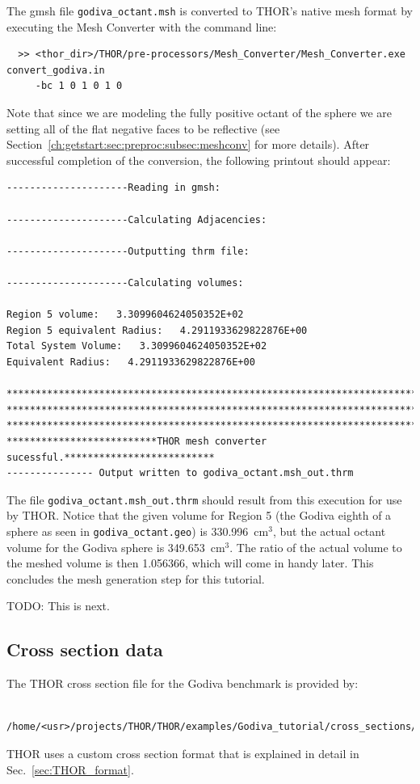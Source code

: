 The gmsh file \verb"godiva_octant.msh" is converted to THOR's native mesh format by executing the Mesh Converter with the command line:
\begin{verbatim}
  >> <thor_dir>/THOR/pre-processors/Mesh_Converter/Mesh_Converter.exe convert_godiva.in
     -bc 1 0 1 0 1 0
\end{verbatim}
Note that since we are modeling the fully positive octant of the sphere we are setting all of the flat negative faces to be reflective (see Section~\ref{ch:getstart:sec:preproc:subsec:meshconv} for more details).
After successful completion of the conversion, the following printout should appear:
\begin{verbatim}
---------------------Reading in gmsh:

---------------------Calculating Adjacencies:

---------------------Outputting thrm file:

---------------------Calculating volumes:

Region 5 volume:   3.3099604624050352E+02
Region 5 equivalent Radius:   4.2911933629822876E+00
Total System Volume:   3.3099604624050352E+02
Equivalent Radius:   4.2911933629822876E+00

**********************************************************************************
**********************************************************************************
**********************************************************************************
**************************THOR mesh converter sucessful.**************************
--------------- Output written to godiva_octant.msh_out.thrm
\end{verbatim}

The file \verb"godiva_octant.msh_out.thrm" should result from this execution for use by THOR.
Notice that the given volume for Region 5 (the Godiva eighth of a sphere as seen in \verb"godiva_octant.geo") is 330.996~cm$^3$, but the actual octant volume for the Godiva sphere is 349.653~cm$^3$.
The ratio of the actual volume to the meshed volume is then 1.056366, which will come in handy later.
This concludes the mesh generation step for this tutorial.

TODO: This is next.

\subsection{Cross section data}
The THOR cross section file for the Godiva benchmark is provided by:
\begin{verbatim}
    /home/<usr>/projects/THOR/THOR/examples/Godiva_tutorial/cross_sections/godiva.xs
\end{verbatim}
THOR uses a custom cross section format that is explained in detail in Sec.~\ref{sec:THOR_format}.

